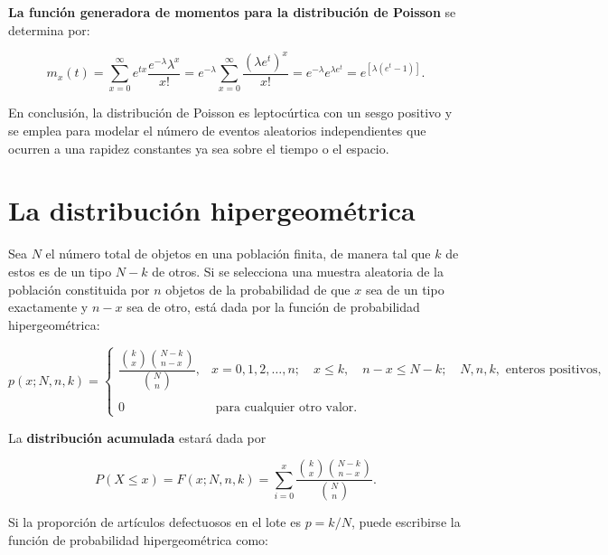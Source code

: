 \textbf{La función generadora de momentos para la distribución de Poisson} se determina por:

\begin{tcolorbox}
    $$m_x(t)=\sum_{x=0}^\infty e^{tx}\dfrac{e^{-\lambda}\lambda^x}{x!}=e^{-\lambda}\sum_{x=0}^\infty \dfrac{\left(\lambda e^t\right)^x}{x!}=e^{-\lambda}e^{\lambda e^t}=e^{[\lambda(e^t-1)]}.$$
\end{tcolorbox}

\begin{tcolorbox}
    En conclusión, la distribución de Poisson es leptocúrtica con un sesgo positivo y se emplea para modelar el número de eventos aleatorios independientes que ocurren a una rapidez constantes ya sea sobre el tiempo o el espacio.
\end{tcolorbox}


\section{La distribución hipergeométrica}

\begin{def.}
    Sea $N$ el número total de objetos en una población finita, de manera tal que $k$ de estos es de un tipo $N-k$ de otros. Si se selecciona una muestra aleatoria de la población constituida por $n$ objetos de la probabilidad de que $x$ sea de un tipo exactamente y $n-x$ sea de otro, está dada por la función de probabilidad hipergeométrica:
    \begin{tcolorbox}
	$$p(x;N,n,k)=\left\{\begin{array}{ll}
		\dfrac{{k \choose x}{N-k\choose n-x}}{{N\choose n}}, & x=0,1,2,\ldots,n;\quad x\leq k, \quad n-x\leq N-k;\quad N,n,k, \mbox{ enteros positivos,}\\\\
		0 & \mbox{ para cualquier otro valor.}
	\end{array}\right.$$
    \end{tcolorbox}
\end{def.}

La \textbf{distribución acumulada} estará dada por 

\begin{tcolorbox}
    $$P(X\leq x) = F(x;N,n,k)=\sum_{i=0}^x \dfrac{{k \choose x}{N-k\choose n-x}}{{N\choose n}}.$$
\end{tcolorbox}

Si la proporción de artículos defectuosos en el lote es $p=k/N$, puede escribirse la función de probabilidad hipergeométrica como:

